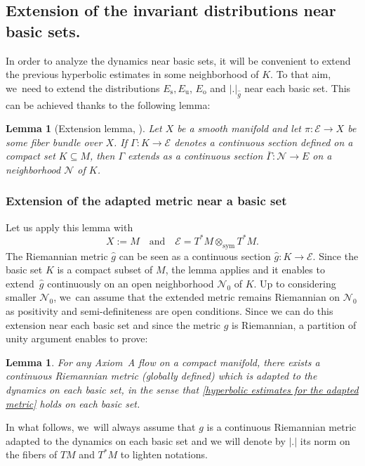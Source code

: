 \documentclass[11pt]{article}
\newcommand{\ro}{\mathrm{o}}
\newcommand{\rs}{\mathrm{s}}
\newcommand{\ru}{\mathrm{u}}
\newcommand{\sym}{\mathrm{sym}}
\theoremstyle{definition}
\theoremstyle{plain}
\newtheorem{lemma}[definition]{Lemma}
\newcommand{\Ecal}{\mathcal{E}}
\newcommand{\Ncal}{\mathcal{N}}
\begin{document}
\subsection{Extension of the invariant distributions near basic sets.}

In order to analyze the dynamics near basic sets, it will be convenient to extend the previous hyperbolic estimates in some neighborhood of $K$. To that aim, we~need to extend the distributions $E_\rs, E_\ru$, $E_\ro$ and $|.|_{\hat{g}}$ near each basic set. This can be achieved thanks to the following lemma:

\begin{lemma}[{Extension lemma, \cite[Lem.\,4.4 p.\,128]{HPPS}}]\label{Lemme geometrique prolongement des sections} Let $X$ be a smooth manifold and let $\pi: \Ecal \to X$ be some fiber bundle over $X$. If $\Gamma: K \to \Ecal$ denotes a continuous section defined on a compact set $K \subseteq M$, then $\Gamma$ extends as a continuous section $\overline{\Gamma}: \Ncal \to E$ on a neighborhood $\Ncal$ of $K$.
\end{lemma}

\subsubsection{Extension of the adapted metric near a basic set} Let us apply this lemma with
\[
X:= M \quad \text{and} \quad \Ecal = T^* M \otimes_{\sym} T^* M.
\]
The Riemannian metric $\hat{g}$ can be seen as a continuous section $\hat{g}: K \to \Ecal$. Since the basic set $K$ is a compact subset of $M$, the lemma applies and it enables to extend~$\hat{g}$ continuously on an open neighborhood $\Ncal_0$ of $K$. Up to considering smaller $\Ncal_0$, we~can assume that the extended metric remains Riemannian on $\Ncal_0$ as positivity and semi-definiteness are open conditions. Since we can do this extension near each basic set and since the metric $g$ is Riemannian, a partition of unity argument enables to prove:

\begin{lemma}
For any Axiom~A flow on a compact manifold, there exists a continuous Riemannian metric (globally defined) which is adapted to the dynamics on each basic set, in the sense that \eqref{hyperbolic estimates for the adapted metric} holds on each basic set.
\end{lemma}

In what follows, we~will always assume that $g$ is a continuous Riemannian metric adapted to the dynamics on each basic set and we will denote by $|.|$ its norm on the fibers of $TM$ and $T^* M$ to lighten notations.
\end{document}
